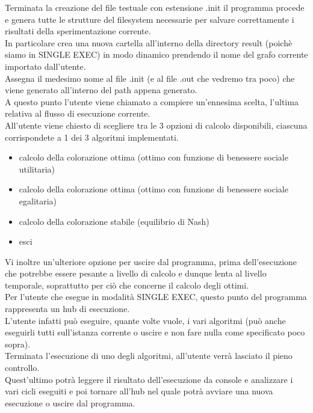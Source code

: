 Terminata la creazione del file testuale con estensione .init il programma procede e genera tutte le strutture del filesystem necessarie per salvare correttamente i risultati della sperimentazione corrente.\\
In particolare crea una nuova cartella all'interno della directory result (poichè siamo in SINGLE EXEC) in modo dinamico prendendo il nome del grafo corrente importato dall'utente.\\
Assegna il medesimo nome al file .init (e al file .out che vedremo tra poco) che viene generato all'interno del path appena generato.\\

A questo punto l'utente viene chiamato a compiere un'ennesima scelta, l'ultima relativa al flusso di esecuzione corrente.\\
All'utente viene chiesto di scegliere tra le 3 opzioni di calcolo disponibili, ciascuna corrispondete a 1 dei 3 algoritmi implementati.

\begin{itemize}
	\item calcolo della colorazione ottima (ottimo con funzione di benessere sociale utilitaria)
	\item calcolo della colorazione ottima (ottimo con funzione di benessere sociale egalitaria)
	\item calcolo della colorazione stabile (equilibrio di Nash)
	\item esci
\end{itemize}

Vi inoltre un'ulteriore opzione per uscire dal programma, prima dell'esecuzione che potrebbe essere pesante a livello di calcolo e dunque lenta al livello temporale, soprattutto per ciò che concerne il calcolo degli ottimi.\\

Per l'utente che esegue in modalità SINGLE EXEC, questo punto del programma rappresenta un hub di esecuzione.\\
L'utente infatti può eseguire, quante volte vuole, i vari algoritmi (può anche eseguirli tutti sull'istanza corrente o uscire e non fare nulla come specificato poco sopra).\\
Terminata l'esecuzione di uno degli algoritmi, all'utente verrà lasciato il pieno controllo.\\
Quest'ultimo potrà leggere il risultato dell'esecuzione da console e analizzare i vari cicli eseguiti e poi tornare all'hub nel quale potrà avviare una nuova esecuzione o uscire dal programma.\\

